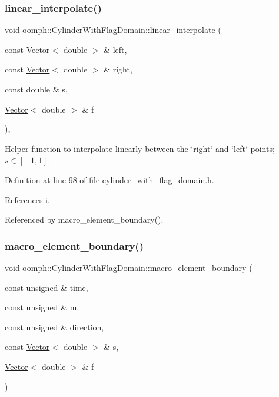 \subsubsection{\texorpdfstring{linear\+\_\+interpolate()}{linear\_interpolate()}}
{\footnotesize\ttfamily void oomph\+::\+Cylinder\+With\+Flag\+Domain\+::linear\+\_\+interpolate (\begin{DoxyParamCaption}\item[{const \hyperlink{classoomph_1_1Vector}{Vector}$<$ double $>$ \&}]{left,  }\item[{const \hyperlink{classoomph_1_1Vector}{Vector}$<$ double $>$ \&}]{right,  }\item[{const double \&}]{s,  }\item[{\hyperlink{classoomph_1_1Vector}{Vector}$<$ double $>$ \&}]{f }\end{DoxyParamCaption})\hspace{0.3cm}{\ttfamily [inline]}, {\ttfamily [private]}}



Helper function to interpolate linearly between the \char`\"{}right\char`\"{} and \char`\"{}left\char`\"{} points; $ s \in [-1,1] $. 



Definition at line 98 of file cylinder\+\_\+with\+\_\+flag\+\_\+domain.\+h.



References i.



Referenced by macro\+\_\+element\+\_\+boundary().

\mbox{\label{classoomph_1_1CylinderWithFlagDomain_a40bca9a30f1f874c043e68621b28de74}} 
\subsubsection{\texorpdfstring{macro\+\_\+element\+\_\+boundary()}{macro\_element\_boundary()}}
{\footnotesize\ttfamily void oomph\+::\+Cylinder\+With\+Flag\+Domain\+::macro\+\_\+element\+\_\+boundary (\begin{DoxyParamCaption}\item[{const unsigned \&}]{time,  }\item[{const unsigned \&}]{m,  }\item[{const unsigned \&}]{direction,  }\item[{const \hyperlink{classoomph_1_1Vector}{Vector}$<$ double $>$ \&}]{s,  }\item[{\hyperlink{classoomph_1_1Vector}{Vector}$<$ double $>$ \&}]{f }\end{DoxyParamCaption})\hspace{0.3cm}{\ttfamily [virtual]}}




